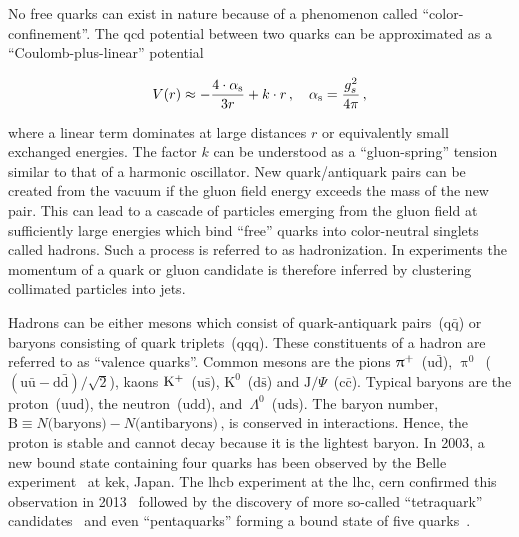 No free quarks can exist in nature because of a phenomenon called ``color-confinement''. The \gls{qcd} potential between two quarks can be approximated as a ``Coulomb-plus-linear'' potential~\cite{Sumino2003173}

\begin{equation}
V(r)\approx-\frac{4\cdot{\alpha_\textrm{s}}}{3r}+k\cdot r\,,\quad {\alpha_\textrm{s}}=\frac{g_{s}^2}{4\pi}\,,
\end{equation}

where a linear term dominates at large distances $r$ or equivalently small exchanged energies. The factor $k$ can be understood as a ``gluon-spring'' tension similar to that of a harmonic oscillator. New quark/antiquark pairs can be created from the vacuum if the gluon field energy exceeds the mass of the new pair. This can lead to a cascade of particles emerging from the gluon field at sufficiently large energies which bind ``free'' quarks into color-neutral singlets called hadrons. Such a process is referred to as hadronization. In experiments the momentum of a quark or gluon candidate is therefore inferred by clustering collimated particles into jets.

Hadrons can be either mesons which consist of quark-antiquark pairs~($\mathrm{q}\bar{\mathrm{q}}$) or baryons consisting of quark triplets~($\mathrm{qqq}$). These constituents of a hadron are referred to as ``valence quarks''. Common mesons are the pions $\uppi^{+}$~($\mathrm{u}\bar{\mathrm{d}}$), $\uppi^{0}$~($(\mathrm{u}\bar{\mathrm{u}}-\mathrm{d}\bar{\mathrm{d}})/\sqrt{2}$), kaons $\mathrm{K}^{+}$~($\mathrm{u}\bar{\mathrm{s}}$), $\mathrm{K}^{0}$~($\mathrm{d}\bar{\mathrm{s}}$) and $\mathrm{J}/\Psi$~($\mathrm{c}\bar{\mathrm{c}}$). Typical baryons are the proton~($\mathrm{uud}$), the neutron~($\mathrm{udd}$), and~$\Lambda^{0}$~($\mathrm{uds}$). The baryon number, $\mathrm{B}\equiv N\text{(baryons)}-N\text{(antibaryons)}\,$, is conserved in interactions. Hence, the proton is stable and cannot decay because it is the lightest baryon. In 2003, a new bound state containing four quarks has been observed by the Belle experiment~\cite{PhysRevLett.91.262001} at \gls{kek}, Japan. The \gls{lhcb} experiment at the \gls{lhc}, \gls{cern} confirmed this observation in 2013~\cite{Aaij:2013zoa} followed by the discovery of more so-called ``tetraquark'' candidates~\cite{Aaij:2014jqa,Aaij:2016iza} and even ``pentaquarks'' forming a bound state of five quarks~\cite{Aaij:2015tga}.

